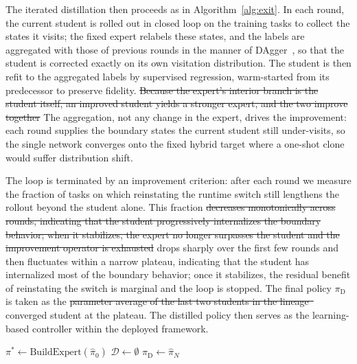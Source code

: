 \documentclass[journal, twoside]{IEEEtran}
\newcommand{\rst}[1]{{\color{rstcolor}#1}}
\begin{document}
{The iterated distillation then proceeds as in Algorithm~\ref{alg:exit}. In each round, the current student is rolled out in closed loop on the training tasks to collect the states it visits; the fixed expert relabels these states, and the labels are aggregated with those of previous rounds in the manner of DAgger~\cite{ross2011reduction}, so that the student is corrected exactly on its own visitation distribution. The student is then refit to the aggregated labels by supervised regression, warm-started from its predecessor to preserve fidelity. \sout{Because the expert's interior branch is the student itself, an improved student yields a stronger expert, and the two improve together} \rst{The aggregation, not any change in the expert, drives the improvement: each round supplies the boundary states the current student still under-visits, so the single network converges onto the fixed hybrid target where a one-shot clone would suffer distribution shift}.

The loop is terminated by an improvement criterion: after each round we measure the fraction of tasks on which reinstating the runtime switch still lengthens the rollout beyond the student alone. This fraction \sout{decreases monotonically across rounds, indicating that the student progressively internalizes the boundary behavior; when it stabilizes, the expert no longer surpasses the student and the improvement operator is exhausted} \rst{drops sharply over the first few rounds and then fluctuates within a narrow plateau, indicating that the student has internalized most of the boundary behavior; once it stabilizes, the residual benefit of reinstating the switch is marginal and the loop is stopped}. The final policy $\pi_{\mathrm{D}}$ is taken as the \sout{parameter average of the last two students in the lineage~\cite{wortsman2022model}} \rst{converged student at the plateau}. The distilled policy then serves as the learning-based controller within the deployed framework.}

\begin{algorithm}[!htbp]
{\color{magenta}
\caption{Iterated distillation of the fixed hybrid expert.}
\label{alg:exit}
$\pi^{*} \leftarrow \mathrm{BuildExpert}(\hat{\pi}_{0})$ 
$\mathcal{D} \leftarrow \emptyset$\;
\Return $\pi_{\mathrm{D}} \leftarrow \hat{\pi}_{N}$ \;
}
\end{algorithm}
\end{document}
